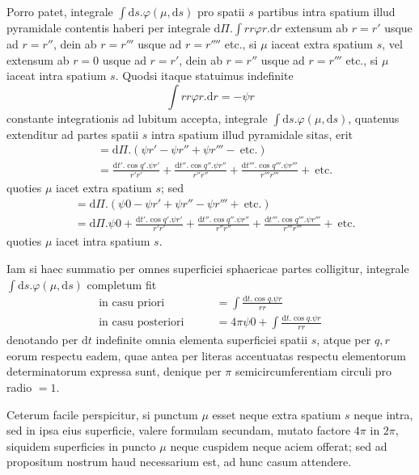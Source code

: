 Porro patet, integrale $\int\mathrm{d}s.\varphi(\mu,\mathrm{d}s)$ pro spatii $s$ partibus intra spatium illud pyramidale contentis haberi per integrale $\mathrm{d}\Pi.\int rr\varphi r.\mathrm{d}r$ extensum ab $r=r'$ usque ad $r=r''$, dein ab $r=r'''$ usque ad $r=r''''$ etc., si $\mu$ iaceat extra spatium $s$, vel extensum ab $r=0$ usque ad $r=r'$, dein ab $r=r''$ usque ad $r=r'''$ etc., si $\mu$ iaceat intra spatium $s$. Quodsi itaque statuimus indefinite
\[
\int rr\varphi r.\mathrm{d}r=-\psi r
\]
constante integrationis ad lubitum accepta, integrale $\int\mathrm{d}s.\varphi(\mu,\mathrm{d}s)$, quatenus extenditur ad partes spatii $s$ intra spatium illud pyramidale sitas, erit
\[
\begin{aligned}
&=\mathrm{d}\Pi.(\psi r'-\psi r''+\psi r'''-\ \text{etc.})\\
&=\frac{\mathrm{d}t'.\cos q'.\psi r'}{r'r'}+\frac{\mathrm{d}t''.\cos q''.\psi r''}{r''r''}+\frac{\mathrm{d}t'''.\cos q'''.\psi r'''}{r'''r'''}+\ \text{etc.}
\end{aligned}
\]
quoties $\mu$ iacet extra spatium $s$; sed
\[
\begin{aligned}
&=\mathrm{d}\Pi.(\psi0-\psi r'+\psi r''-\psi r'''+\ \text{etc.})\\
&=\mathrm{d}\Pi.\psi0+\frac{\mathrm{d}t'.\cos q'.\psi r'}{r'r'}+\frac{\mathrm{d}t''.\cos q''.\psi r''}{r''r''}+\frac{\mathrm{d}t'''.\cos q'''.\psi r'''}{r'''r'''}+\ \text{etc.}
\end{aligned}
\]
quoties $\mu$ iacet intra spatium $s$.

Iam si haec summatio per omnes superficiei sphaericae partes colligitur, integrale $\int\mathrm{d}s.\varphi(\mu,\mathrm{d}s)$ completum fit
\[
\begin{aligned}
\text{in casu priori}\qquad&=\int\frac{\mathrm{d}t.\cos q.\psi r}{rr}\\
\text{in casu posteriori}\qquad&=4\pi\psi0+\int\frac{\mathrm{d}t.\cos q.\psi r}{rr}
\end{aligned}
\]
denotando per $\mathrm{d}t$ indefinite omnia elementa superficiei spatii $s$, atque per $q,r$ eorum respectu eadem, quae antea per literas accentuatas respectu elementorum determinatorum expressa sunt, denique per $\pi$ semicircumferentiam circuli pro radio $=1$.

Ceterum facile perspicitur, si punctum $\mu$ esset neque extra spatium $s$ neque intra, sed in ipsa eius superficie, valere formulam secundam, mutato factore $4\pi$ in $2\pi$, siquidem superficies in puncto $\mu$ neque cuspidem neque aciem offerat; sed ad propositum nostrum haud necessarium est, ad hunc casum attendere.


